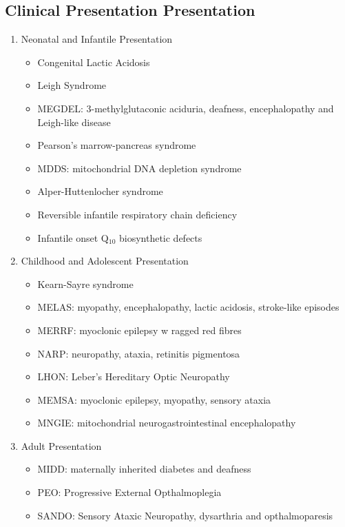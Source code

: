 \documentclass{scrartcl}
\begin{document}
\subsection{Clinical Presentation Presentation}
\label{sec:org24673e8}
\begin{enumerate}
\item Neonatal and Infantile Presentation
\label{sec:orged74126}
\begin{itemize}
\item Congenital Lactic Acidosis
\item Leigh Syndrome
\item MEGDEL: 3-methylglutaconic aciduria, deafness, encephalopathy and Leigh-like disease
\item Pearson's marrow-pancreas syndrome
\item MDDS: mitochondrial DNA depletion syndrome
\item Alper-Huttenlocher syndrome
\item Reversible infantile respiratory chain deficiency
\item Infantile onset Q\(_{\text{10}}\) biosynthetic defects
\end{itemize}

\item Childhood and Adolescent Presentation
\label{sec:org929c115}
\begin{itemize}
\item Kearn-Sayre syndrome
\item MELAS: myopathy, encephalopathy, lactic acidosis, stroke-like episodes
\item MERRF: myoclonic epilepsy w ragged red fibres
\item NARP: neuropathy, ataxia, retinitis pigmentosa
\item LHON: Leber's Hereditary Optic Neuropathy
\item MEMSA: myoclonic epilepsy, myopathy, sensory ataxia
\item MNGIE: mitochondrial neurogastrointestinal encephalopathy
\end{itemize}

\item Adult Presentation
\label{sec:org0c13140}
\begin{itemize}
\item MIDD: maternally inherited diabetes and deafness
\item PEO: Progressive External Opthalmoplegia
\item SANDO: Sensory Ataxic Neuropathy, dysarthria and opthalmoparesis
\end{itemize}
\end{enumerate}
\end{document}
